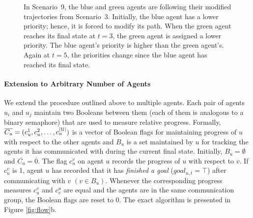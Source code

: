 \begin{eg}
\begin{figure}[htb!]
{}
\caption[Example of dynamic priority allocation to guarantee fairness]{ In Scenario~9, the blue and green agents are following their modified trajectories from Scenario~3. Initially, the blue agent has a lower priority; hence, it is forced to modify its path. When the green agent reaches its final state at $t=3$, the green agent is assigned a lower priority. The blue agent's priority is higher than the green agent's. Again at $t=5$, the priorities change since the blue agent has reached its final state.}
\label{fig:eg6}
\end{figure}
\end{eg}

\paragraph*{Extension to Arbitrary Number of Agents}

We extend the procedure outlined above to multiple agents. Each pair of agents $u_i$ and $u_j$ maintain two Booleans between them (each of them is analogous to a binary semaphore) that are used to measure relative progress. 
Formally, $\overline{C_u} = (c_u^1,c_u^2,\ldots ,c_u^{|\mathcal{U}|})$ is a vector of Boolean flags for maintaining progress of $u$ with respect to the other agents and $B_u$ is a set maintained by $u$ for tracking the agents it has communicated with during the current final state.
Initially, $B_u = \emptyset$ and $\overline{C_u} = \overline{0}$. The flag $c_u^v$ on agent $u$ records the progress of $u$ with respect to $v$. If $c^v_u$ is 1, agent $u$ has recorded that it has \emph{finished a goal} ($goal_{u,t} = \top$) after communicating with $v$ $(v \in B_u)$. Whenever the corresponding progress measures $c_u^v$ and $c_v^u$ are equal and the agents are in the same communication group, the Boolean flags are reset to $0$. The exact algorithm is presented in Figure \ref{fig:flow}b.

